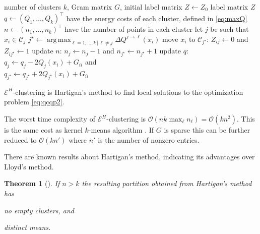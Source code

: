 \documentclass[twoside]{article}
\newtheorem{theorem}{Theorem}
\DeclareMathOperator*{\argmax}{arg\,max}
\newcommand\C{{\mathcal{C}}}
\newcommand\OO{{\mathcal{O}}}
\begin{document}
\begin{algorithm}
\begin{algorithmic}[1]
    \INPUT number of clusters $k$, Gram matrix $G$, 
                initial label matrix $Z \leftarrow Z_0$
    \OUTPUT label matrix $Z$
  \STATE $q \leftarrow (Q_1, \dotsc, Q_k)^\top$ 
            have the energy costs of each cluster, defined in \eqref{eq:maxQ}
  \STATE $n \leftarrow (n_1,\dotsc,n_k)^\top$ have the number of points 
        in each cluster%
  \REPEAT
        \STATE let $j$ be such that $x_i \in \C_j$
        \STATE $j^\star \leftarrow \argmax_{\ell=1,\dotsc,k \, | \, \ell\ne j} 
                \Delta Q^{j\to \ell}(x_i)$
            \STATE move $x_i$ to $\C_{j^\star}$: $Z_{ij} \leftarrow 0$ and 
            $Z_{ij^\star} \leftarrow 1$
            \STATE update $n$: $n_j \leftarrow n_j - 1$ and
                    $n_{j^\star} \leftarrow n_{j^\star} + 1$
            \STATE update $q$: $q_j \leftarrow q_j - 2Q_j(x_i) + G_{ii}$ and \\
             \hspace{4.5em}$q_{j^\star} \leftarrow q_{j^\star} + 
                            2Q_{j^\star}(x_i)+ G_{ii}$
        \ENDIF
    \ENDFOR
\end{algorithmic}
\caption{\label{algo}
$\mathcal{E}^H$-clustering is Hartigan's method to find local solutions to the optimization problem \eqref{eq:qcqp2}.
}
\end{algorithm}

The worst time complexity of $\mathcal{E}^H$-clustering is
$\OO(n k  \max_\ell n_\ell) =\OO(k n^2)$. 
This is the same cost as kernel $k$-means algorithm
\citep{Dhillon2,Dhillon}. 
If $G$ is sparse
this can be further reduced to $\OO(k n')$ where $n'$ is the number of 
nonzero entries.

There are known results about Hartigan's method,
indicating its advantages over Lloyd's method.

\begin{theorem}[\cite{Telgarsky}]
If $n > k$ the resulting partition obtained from Hartigan's method has 
\begin{enumerate*}
\item \label{noempty} no empty clusters, and
\item \label{diffmean} distinct means.
\end{enumerate*}
\end{theorem}
\end{document}
